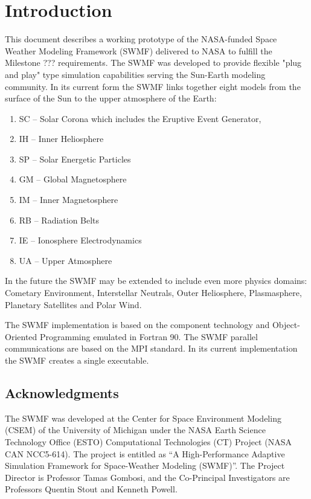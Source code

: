 


\chapter{Introduction}

This document describes a working prototype of the NASA-funded Space
Weather Modeling Framework (SWMF) delivered to NASA to fulfill the
Milestone ??? requirements. The SWMF was developed to provide flexible
"plug and play" type simulation capabilities serving the Sun-Earth
modeling community.  In its current form the SWMF links together eight
models from the surface of the Sun to the upper atmosphere of the Earth: 
\begin{enumerate}
\item SC -- Solar Corona which includes the Eruptive Event Generator,
\item IH -- Inner Heliosphere
\item SP -- Solar Energetic Particles 
\item GM -- Global Magnetosphere 
\item IM -- Inner Magnetosphere
\item RB -- Radiation Belts
\item IE -- Ionosphere Electrodynamics
\item UA -- Upper Atmosphere
\end{enumerate}
In the future the SWMF may be extended to include even more 
physics domains: Cometary Environment, Interstellar
Neutrals, Outer Heliosphere, Plasmasphere, Planetary Satellites and
Polar Wind. 

The SWMF implementation is based on the component technology and
Object-Oriented Programming emulated in Fortran 90.  The SWMF parallel
communications are based on the MPI standard.  In its current
implementation the SWMF creates a single executable.

\section{Acknowledgments}

The SWMF was developed at the Center for Space Environment Modeling
(CSEM) of the University of Michigan under the NASA Earth Science
Technology Office (ESTO) Computational Technologies (CT) Project (NASA
CAN NCC5-614). The project is entitled as ``A High-Performance
Adaptive Simulation Framework for Space-Weather Modeling (SWMF)''.
The Project Director is Professor Tamas Gombosi, and the Co-Principal
Investigators are Professors Quentin Stout and Kenneth Powell.

